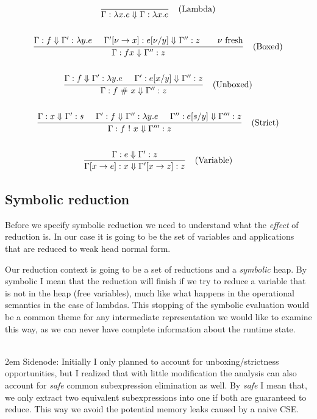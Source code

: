 \documentclass[a4paper]{article}
\begin{document}
\begin{gather*}
  \infer
      [\text{(Lambda)}]
      {\Gamma : \lambda x. e \reduces \Gamma : \lambda x. e}
      {}
      \\
      \\
  \infer
      [\text{(Boxed)}]
      {\Gamma : f x \reduces \Gamma'' : z}
      {\Gamma : f \reduces \Gamma' : \lambda y. e \;\;\;\;\; \Gamma'[\nu \to x] : e[\nu/y] \reduces \Gamma'' : z \;\;\;\;\; \text{$\nu$ fresh}}
      \\
      \\
  \infer
      [\text{(Unboxed)}]
      {\Gamma : f \unboxed x \reduces \Gamma'' : z}
      {\Gamma : f \reduces \Gamma' : \lambda y. e \;\;\;\;\; \Gamma' : e[x/y] \reduces \Gamma'' : z}
      \\
      \\
  \infer
      [\text{(Strict)}]
      {\Gamma : f \strict x \reduces \Gamma''' : z}
      {\Gamma : x \reduces \Gamma' : s \;\;\;\;\; \Gamma' : f \reduces \Gamma'' : \lambda y. e \;\;\;\;\; \Gamma'' : e[s/y] \reduces \Gamma''' : z}
      \\
      \\
  \infer
      [\text{(Variable)}]
      {\Gamma[x \to e] : x \reduces \Gamma'[x \to z] : z}
      {\Gamma : e \reduces \Gamma' : z}
\end{gather*}


\subsection{Symbolic reduction}

Before we specify symbolic reduction we need to understand what the \emph{effect} of reduction is. In our case it is going to be the set of variables and applications that are reduced to weak head normal form.

Our reduction context is going to be a set of reductions and a \emph{symbolic} heap. By symbolic I mean that the reduction will finish if we try to reduce a variable that is not in the heap (free variables), much like what happens in the operational semantics in the case of lambdas. This stopping of the symbolic evaluation would be a common theme for any intermediate representation we would like to examine this way, as we can never have complete information about the runtime state.

\mbox{}\\

\begingroup
\leftskip2em Sidenode: Initially I only planned to account for unboxing/strictness opportunities, but I realized that with little modification the analysis can also account for \emph{safe} common subexpression elimination as well. By \emph{safe} I mean that, we only extract two equivalent subexpressions into one if both are guaranteed to reduce. This way we avoid the potential memory leaks caused by a naive CSE.
\par
\endgroup
\end{document}
